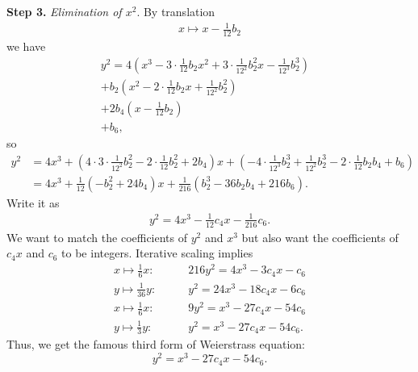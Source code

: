 \documentclass[11pt]{article}
\begin{document}
\textbf{Step 3.}
\emph{Elimination of $x^2$}.
By translation
\begin{align*}
\boxed{x\mapsto x-\tfrac1{12}b_2}
\end{align*}
we have
\begin{align*}
y^2=4\left(x^3-3\cdot\frac1{12}b_2x^2+3\cdot\frac1{12^2}b_2^2x-\frac1{12^3}b_2^3\right)&\\
+b_2\left(x^2-2\cdot\frac1{12}b_2x+\frac1{12^2}b_2^2\right)&\\
+2b_4\left(x-\frac1{12}b_2\right)&\\
+b_6,&
\end{align*}
so
\begin{align*}
y^2&=4x^3+\left(4\cdot3\cdot\frac1{12^2}b_2^2-2\cdot\frac1{12}b_2^2+2b_4\right)x+\left(-4\cdot\frac1{12^3}b_2^3+\frac1{12^2}b_2^3-2\cdot\frac1{12}b_2b_4+b_6\right)\\
&=4x^3+\frac1{12}\left(-b_2^2+24b_4\right)x+\frac1{216}\left(b_2^3-36b_2b_4+216b_6\right).
\end{align*}
Write it as
\begin{align*}
y^2=4x^3-\frac1{12}c_4x-\frac1{216}c_6.
\end{align*}
We want to match the coefficients of $y^2$ and $x^3$ but also want the coefficients of $c_4x$ and $c_6$ to be integers.
Iterative scaling implies
\begin{align*}
x\mapsto\tfrac16x:&\qquad 216y^2=4x^3-3c_4x-c_6\\
y\mapsto\tfrac1{36}y:&\qquad y^2=24x^3-18c_4x-6c_6\\
x\mapsto\tfrac16x:&\qquad 9y^2=x^3-27c_4x-54c_6\\
y\mapsto\tfrac13y:&\qquad y^2=x^3-27c_4x-54c_6.
\end{align*}
Thus, we get the famous third form of Weierstrass equation:
\[y^2=x^3-27c_4x-54c_6.\tag{3}\]
\end{document}

